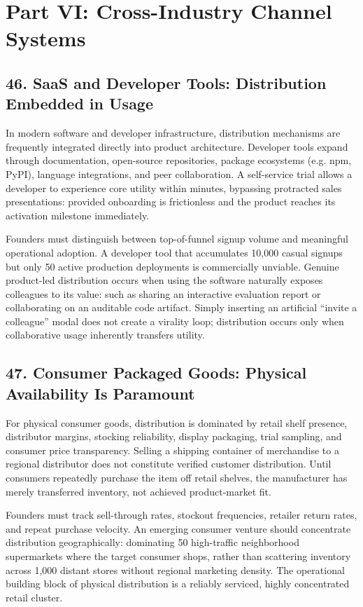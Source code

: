 \section*{Part VI: Cross-Industry Channel Systems}

\subsection*{46. SaaS and Developer Tools: Distribution Embedded in Usage}

In modern software and developer infrastructure, distribution mechanisms are frequently integrated directly into product architecture. Developer tools expand through documentation, open-source repositories, package ecosystems (e.g. npm, PyPI), language integrations, and peer collaboration. A self-service trial allows a developer to experience core utility within minutes, bypassing protracted sales presentations: provided onboarding is frictionless and the product reaches its activation milestone immediately.

Founders must distinguish between top-of-funnel signup volume and meaningful operational adoption. A developer tool that accumulates 10,000 casual signups but only 50 active production deployments is commercially unviable. Genuine product-led distribution occurs when using the software naturally exposes colleagues to its value: such as sharing an interactive evaluation report or collaborating on an auditable code artifact. Simply inserting an artificial ``invite a colleague'' modal does not create a virality loop; distribution occurs only when collaborative usage inherently transfers utility.

\subsection*{47. Consumer Packaged Goods: Physical Availability Is Paramount}

For physical consumer goods, distribution is dominated by retail shelf presence, distributor margins, stocking reliability, display packaging, trial sampling, and consumer price transparency. Selling a shipping container of merchandise to a regional distributor does not constitute verified customer distribution. Until consumers repeatedly purchase the item off retail shelves, the manufacturer has merely transferred inventory, not achieved product-market fit.

Founders must track sell-through rates, stockout frequencies, retailer return rates, and repeat purchase velocity. An emerging consumer venture should concentrate distribution geographically: dominating 50 high-traffic neighborhood supermarkets where the target consumer shops, rather than scattering inventory across 1,000 distant stores without regional marketing density. The operational building block of physical distribution is a reliably serviced, highly concentrated retail cluster.

